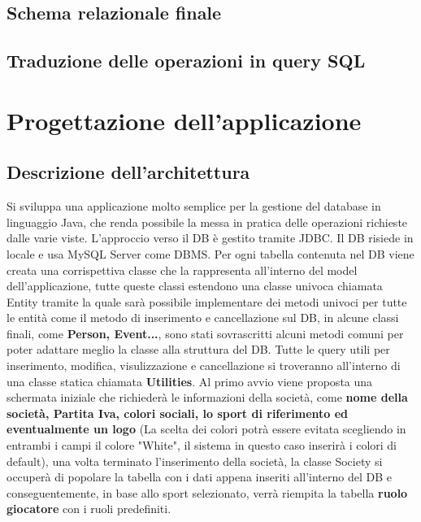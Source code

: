 \documentclass[a4paper,12pt]{report}
\begin{document}
\section{Schema relazionale finale}
\section{Traduzione delle operazioni in query SQL}

\chapter{Progettazione dell'applicazione}
\section{Descrizione dell'architettura}
Si sviluppa una applicazione molto semplice per la gestione del database in linguaggio Java, che renda 
possibile la messa in pratica delle operazioni richieste dalle varie viste. L’approccio verso il DB è gestito 
tramite JDBC. Il DB risiede in locale e usa MySQL Server come DBMS.  
Per ogni tabella contenuta nel DB viene creata una corrispettiva classe che la rappresenta all’interno del 
model dell’applicazione, tutte queste classi estendono una classe univoca chiamata Entity tramite la quale
sarà possibile implementare dei metodi univoci per tutte le entità come il metodo di inserimento e cancellazione sul DB,
in alcune classi finali, come \textbf{Person, Event...}, sono stati sovrascritti alcuni metodi comuni per poter adattare
meglio la classe alla struttura del DB.
Tutte le query utili per inserimento, modifica, visulizzazione e cancellazione si troveranno all'interno di una classe
statica chiamata \textbf{Utilities}.
Al primo avvio viene proposta una schermata iniziale che richiederà le informazioni della società, come
\textbf{nome della società, Partita Iva, colori sociali, lo sport di riferimento ed eventualmente un logo} (La scelta dei colori
potrà essere evitata scegliendo in entrambi i campi il colore "White", il sistema in questo caso inserirà i colori di default),
una volta terminato l'inserimento della società, la classe Society si occuperà di popolare la tabella con i dati appena inseriti
all'interno del DB e conseguentemente, in base allo sport selezionato, verrà riempita la tabella \textbf{ruolo giocatore} con i ruoli predefiniti.
\end{document}
